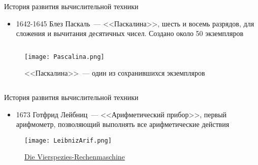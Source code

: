 \documentclass[aspectratio=169,14pt]{beamer}
\begin{document}
\begin{frame}{История развития вычислительной техники}
    \begin{itemize}
        \item 1642-1645 Блез Паскаль~--- <<Паскалина>>, шесть и восемь разрядов, для сложения и вычитания десятичных чисел. Создано около 50 экземпляров
    \end{itemize}
    \begin{columns}[T,onlytextwidth]
        \begin{column}{0.5\textwidth}
            \begin{figure}[htp]
                \centering
                \texttt{[image: Pascalina.png]}
                \caption{<<Паскалина>>~--- один из сохранившихся экземпляров}
                \label{fig:Pascalina}
            \end{figure}
        \end{column}
        \begin{column}{0.5\textwidth}
        \end{column}
    \end{columns}
\end{frame}

\begin{frame}{История развития вычислительной техники}
    \begin{itemize}
        \item 1673 Готфрид Лейбниц~--- <<Арифметический прибор>>, первый арифмометр, позволяющий
        выполнять все арифметические действия
    \end{itemize}
    \begin{figure}[htp]
        \centering
        \texttt{[image: LeibnizArif.png]}
        \caption{\href{https://www.youtube.com/watch?v=v6ruUDIeK6I}
         {\glqq Die Vierspezies-Rechenmaschine\grqq}}
        \label{fig:LeibnizArif}
    \end{figure}
\end{frame}
\end{document}
